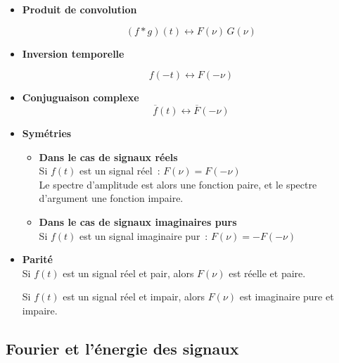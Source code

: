 \begin{itemize}
\item \textbf{Produit de convolution}

\begin{equation}
\left( f \ast g\right)(t) \leftrightarrow F(\nu) \, G(\nu)
\end{equation}

\item \textbf{Inversion temporelle}

\begin{equation}
	f(-t) \leftrightarrow F(-\nu)
\end{equation}
	
\item \textbf{Conjuguaison complexe}
	\begin{equation}
		\overline{f}(t) \leftrightarrow \overline{F}(-\nu)
	\end{equation}

\pagebreak 
\item \textbf{Symétries}\\
\begin{itemize}
\item \textbf{ Dans le cas de signaux réels } \\

Si $f(t)$ est un signal réel~: $F(\nu) = F(-\nu)$ \\

Le spectre d'amplitude est alors une fonction paire, et le spectre d'argument une fonction impaire. \\

	\item \textbf{ Dans le cas de signaux imaginaires purs } \\
	
Si $f(t)$ est un signal imaginaire pur~: $F(\nu) = - F(-\nu)$ \\

\end{itemize}

\item{ \textbf{Parité}} \\

Si $f(t)$ est un signal réel et pair, alors $F(\nu)$ est réelle et paire. 

Si $f(t)$ est un signal réel et impair, alors $F(\nu)$ est imaginaire pure et impaire. 

\end{itemize}

\subsection*{Fourier et l'énergie des signaux}

